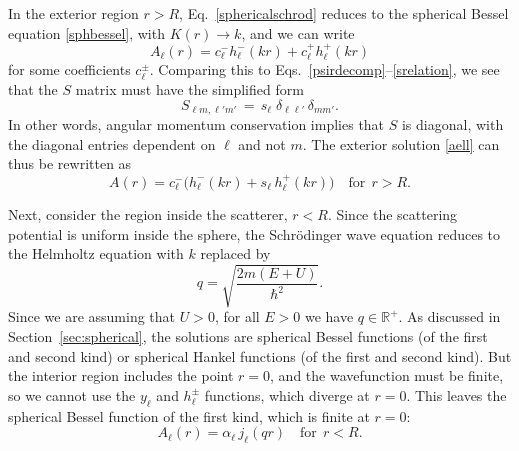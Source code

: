 \documentclass[pra,12pt]{revtex4}
\begin{document}
In the exterior region $r > R$, Eq.~\eqref{sphericalschrod} reduces to
the spherical Bessel equation \eqref{sphbessel}, with $K(r)
\rightarrow k$, and we can write
\begin{equation}
  A_{\ell}(r) = c^-_\ell h^-_\ell(kr) + c^+_\ell h^+_\ell(kr)
  \label{aell}
\end{equation}
for some coefficients $c^\pm_\ell$.  Comparing this to
Eqs.~\eqref{psirdecomp}--\eqref{srelation}, we see that the $S$ matrix
must have the simplified form
\begin{equation}
  S_{\ell m, \ell' m'} \,=\, s_{\ell} \; \delta_{\ell \ell'} \, \delta_{mm'}.
\end{equation}
In other words, angular momentum conservation implies that $S$ is
diagonal, with the diagonal entries dependent on $\ell$ and not $m$.
The exterior solution \eqref{aell} can thus be rewritten as
\begin{equation}
  A(r) = c^-_\ell \Big(h^-_\ell(kr) + s_\ell\, h^+_\ell(kr)\Big)
  \quad \textrm{for}\,\;r > R.
  \label{Aoutside}
\end{equation}

Next, consider the region inside the scatterer, $r < R$.  Since the
scattering potential is uniform inside the sphere, the Schr\"odinger
wave equation reduces to the Helmholtz equation with $k$ replaced by
\begin{equation}
  q = \sqrt{\frac{2m(E+U)}{\hbar^2}}.
\end{equation}
Since we are assuming that $U > 0$, for all $E > 0$ we have $q \in
\mathbb{R}^+$.  As discussed in Section~\ref{sec:spherical}, the
solutions are spherical Bessel functions (of the first and second
kind) or spherical Hankel functions (of the first and second kind).
But the interior region includes the point $r = 0$, and the
wavefunction must be finite, so we cannot use the $y_\ell$ and
$h_\ell^\pm$ functions, which diverge at $r = 0$.  This leaves the
spherical Bessel function of the first kind, which is finite at $r =
0$:
\begin{equation}
  A_{\ell}(r) = \alpha_\ell \, j_\ell(qr)
  \quad \textrm{for}\,\;r < R.
  \label{Ainside}
\end{equation}
\end{document}
